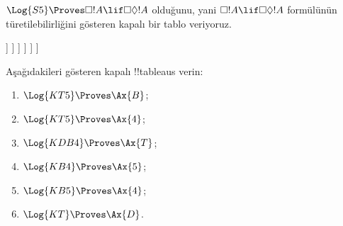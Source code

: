 \documentclass[../../../include/open-logic-section]{subfiles}
\begin{document}
\begin{ex}
  $\Log{S5} \Proves \Box!A \lif \Box\Diamond!A$ olduğunu, yani
  $\Box!A \lif \Box\Diamond!A$ formülünün türetilebilirliğini gösteren kapalı
  bir tablo veriyoruz.
  \begin{oltableau}
    [\pFmla{\False}{\Box\formula{A} \lif \Box\Diamond \formula{A}}{1},
      just = \TAss
      [\pFmla{\True}{\Box \formula{A}}{1}, just = {\TRule{\False}{\lif}[1]}
        [\pFmla{\False}{\Box\Diamond \formula{A}}{1},
          just = {\TRule{\False}{\lif}[1]}
          [\pFmla{\False}{\Diamond \formula{A}}{1.1},
            just = {\TRule{\False}{\Box}[3]}
            [\pFmla{\False}{\Diamond \formula{A}}{1},
              just = {4r$\Diamond$ 4}
              [\pFmla{\False}{\formula{A}}{1.1},
                just = {\TRule{\False}{\Diamond}[5]}
                [\pFmla{\True}{\formula{A}}{1.1},
                  just = {\TRule{\True}{\Box}[2]}, close]
              ]
            ]
          ]
        ]
      ]
    ]
  \end{oltableau}
\end{ex}

\begin{prob}
Aşağıdakileri gösteren kapalı !!{tableau}s verin:
  \begin{enumerate}
  \item $\Log{KT5} \Proves \Ax{B}$;
  \item $\Log{KT5} \Proves \Ax{4}$;
  \item $\Log{KDB4} \Proves \Ax{T}$;
  \item $\Log{KB4} \Proves \Ax{5}$;
  \item $\Log{KB5} \Proves \Ax{4}$;
  \item $\Log{KT} \Proves \Ax{D}$.
  \end{enumerate}
\end{prob}
\end{document}
